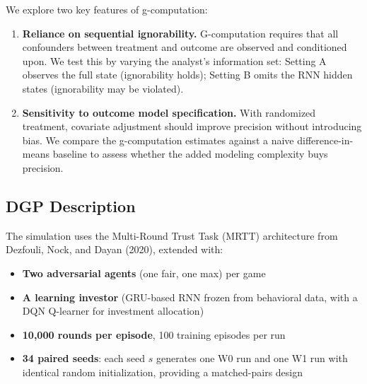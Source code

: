 \documentclass[
]{article}
\providecommand{\tightlist}{%
  \setlength{\itemsep}{0pt}\setlength{\parskip}{0pt}}
\begin{document}
We explore two key features of g-computation:

\begin{enumerate}
\def\labelenumi{\arabic{enumi}.}
\item
  \textbf{Reliance on sequential ignorability.} G-computation requires
  that all confounders between treatment and outcome are observed and
  conditioned upon. We test this by varying the analyst's information
  set: Setting A observes the full state (ignorability holds); Setting B
  omits the RNN hidden states (ignorability may be violated).
\item
  \textbf{Sensitivity to outcome model specification.} With randomized
  treatment, covariate adjustment should improve precision without
  introducing bias. We compare the g-computation estimates against a
  naive difference-in-means baseline to assess whether the added
  modeling complexity buys precision.
\end{enumerate}

\subsection{DGP Description}\label{dgp-description}

The simulation uses the Multi-Round Trust Task (MRTT) architecture from
Dezfouli, Nock, and Dayan (2020), extended with:

\begin{itemize}
\tightlist
\item
  \textbf{Two adversarial agents} (one fair, one max) per game
\item
  \textbf{A learning investor} (GRU-based RNN frozen from behavioral
  data, with a DQN Q-learner for investment allocation)
\item
  \textbf{10,000 rounds per episode}, 100 training episodes per run
\item
  \textbf{34 paired seeds}: each seed \(s\) generates one W0 run and one
  W1 run with identical random initialization, providing a matched-pairs
  design
\end{itemize}
\end{document}
